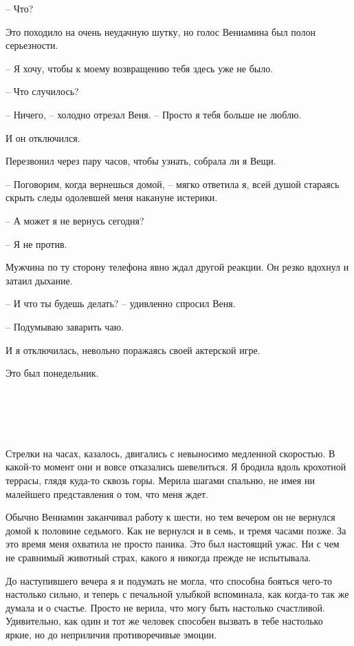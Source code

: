 \documentclass[
]{book}
\begin{document}
-- Что?

Это походило на очень неудачную шутку, но голос Вениамина был полон серьезности.

-- Я хочу, чтобы к моему возвращению тебя здесь уже не было.

-- Что случилось?

-- Ничего, -- холодно отрезал Веня. -- Просто я тебя больше не люблю.

И он отключился.

Перезвонил через пару часов, чтобы узнать, собрала ли я Вещи.

-- Поговорим, когда вернешься домой, -- мягко ответила я, всей душой стараясь скрыть следы одолевшей меня накануне истерики.

-- А может я не вернусь сегодня?

-- Я не против.

Мужчина по ту сторону телефона явно ждал другой реакции. Он резко вдохнул и затаил дыхание.

-- И что ты будешь делать? -- удивленно спросил Веня.

-- Подумываю заварить чаю.

И я отключилась, невольно поражаясь своей актерской игре.

Это был понедельник.

\hypertarget{chapter-84}{%
\chapter{~}\label{chapter-84}}

Стрелки на часах, казалось, двигались с невыносимо медленной скоростью. В какой-то момент они и вовсе отказались шевелиться. Я бродила вдоль крохотной террасы, глядя куда-то сквозь горы. Мерила шагами спальню, не имея ни малейшего представления о том, что меня ждет.

Обычно Вениамин заканчивал работу к шести, но тем вечером он не вернулся домой к половине седьмого. Как не вернулся и в семь, и тремя часами позже. За это время меня охватила не просто паника. Это был настоящий ужас. Ни с чем не сравнимый животный страх, какого я никогда прежде не испытывала.

До наступившего вечера я и подумать не могла, что способна бояться чего-то настолько сильно, и теперь с печальной улыбкой вспоминала, как когда-то так же думала и о счастье. Просто не верила, что могу быть настолько счастливой. Удивительно, как один и тот же человек способен вызвать в тебе настолько яркие, но до неприличия противоречивые эмоции.
\end{document}
